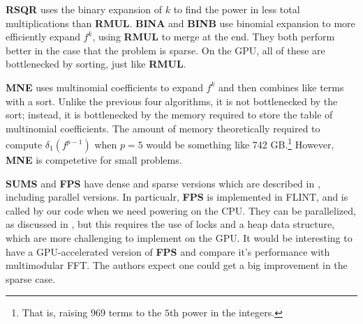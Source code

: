 \textbf{RSQR} uses the binary expansion of \(k\) to find the power in less
total multiplications than \textbf{RMUL}.
\textbf{BINA} and \textbf{BINB} use binomial expansion to more efficiently 
expand \(f^{k}\), using \textbf{RMUL} to merge at the end.
They both perform better in the case that the problem is sparse.
On the GPU, all of these are bottlenecked by sorting, just like
\textbf{RMUL}.

\textbf{MNE} uses multinomial coefficients to expand \(f^{k}\) 
and then combines like terms with a sort. 
Unlike the previous four algorithms, it is not bottlenecked by the sort;
instead, it is bottlenecked by the memory required to store the table of
multinomial coefficients. 
The amount of memory theoretically required to compute 
$\delta_1(f ^ {p - 1})$ when \(p=5\) 
would be something like 742 GB.\footnote{
	That is, raising 
    $969$ terms to the $5$th power
	in the integers.
}
However, \textbf{MNE} is competetive for small problems.

\textbf{SUMS} and \textbf{FPS} have dense and sparse versions which are described in 
\cite{monagan-2012-sparse-powering}, including parallel versions.
In particualr, \textbf{FPS} is implemented in FLINT, and is called by our
code when we need powering on the CPU.
They can be parallelized, as discussed in \cite{monagan-2012-sparse-powering},
but this requires the use of locks and a heap data structure,
which are more challenging to implement on the GPU.
It would be interesting to have a GPU-accelerated version of
\textbf{FPS} and compare it's performance with 
multimodular FFT.
The authors expect one could get a big improvement in the sparse case.




